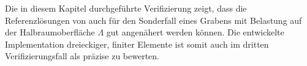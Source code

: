 
Die in diesem Kapitel durchgeführte Verifizierung zeigt, dass die Referenzlösungen von \cite{Freisinger2022} auch für den Sonderfall eines Grabens mit Belastung auf der Halbraumoberfläche $\Lambda$ gut angenähert werden können. Die entwickelte Implementation dreieckiger, finiter Elemente ist somit auch im dritten Verifizierungsfall als präzise zu bewerten.











